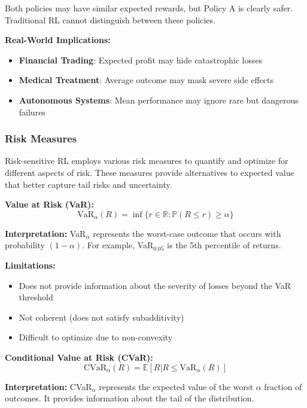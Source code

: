 \documentclass[12pt]{article}
\begin{document}
{{{{Both policies may have similar expected rewards, but Policy A is clearly safer. Traditional RL cannot distinguish between these policies.

\textbf{Real-World Implications:}
\begin{itemize}
\item \textbf{Financial Trading}: Expected profit may hide catastrophic losses
\item \textbf{Medical Treatment}: Average outcome may mask severe side effects
\item \textbf{Autonomous Systems}: Mean performance may ignore rare but dangerous failures
\end{itemize}

\subsubsection{Risk Measures}

Risk-sensitive RL employs various risk measures to quantify and optimize for different aspects of risk. These measures provide alternatives to expected value that better capture tail risks and uncertainty.

\textbf{Value at Risk (VaR):}
\begin{equation}
\text{VaR}_\alpha(R) = \inf\{r \in \mathbb{R} : \mathbb{P}(R \leq r) \geq \alpha\}
\end{equation}

\textbf{Interpretation:} VaR$_\alpha$ represents the worst-case outcome that occurs with probability $(1-\alpha)$. For example, VaR$_{0.05}$ is the 5th percentile of returns.

\textbf{Limitations:}
\begin{itemize}
\item Does not provide information about the severity of losses beyond the VaR threshold
\item Not coherent (does not satisfy subadditivity)
\item Difficult to optimize due to non-convexity
\end{itemize}

\textbf{Conditional Value at Risk (CVaR):}
\begin{equation}
\text{CVaR}_\alpha(R) = \mathbb{E}[R | R \leq \text{VaR}_\alpha(R)]
\end{equation}

\textbf{Interpretation:} CVaR$_\alpha$ represents the expected value of the worst $\alpha$ fraction of outcomes. It provides information about the tail of the distribution.

}}}}
\end{document}
